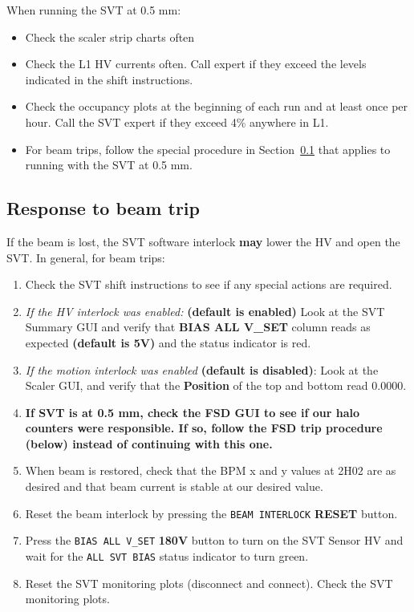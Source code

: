 \documentclass[12pt]{report}
\begin{document}
When running the SVT at 0.5 mm:
\begin{itemize}
\item Check the scaler strip charts often
\item Check the L1 HV currents often.  Call expert if they exceed the levels indicated in the shift instructions.
\item Check the occupancy plots at the beginning of each run and at least once per hour.  Call the SVT expert if they exceed 4\% anywhere in L1.
\item For beam trips, follow the special procedure in Section~\ref{sec:proc_general_beamtrip} that applies to running with the SVT at 0.5 mm.
\end{itemize}

\subsection{Response to beam trip}
\label{sec:proc_general_beamtrip}
If the beam is lost, the SVT software interlock \textbf{may} lower the HV and open the SVT.  In general, for beam trips:
\begin{enumerate}
\item Check the SVT shift instructions to see if any special actions are required.
\item \textit{If the HV interlock was enabled:} \textbf{(default is enabled)} Look at the SVT Summary GUI and verify that \textbf{BIAS ALL V\_SET} column reads as expected \textbf{(default is 5V)} and the status indicator is red.
\item \textit{If the motion interlock was enabled} \textbf{(default is disabled)}: Look at the Scaler GUI, and verify that the \textbf{Position} of the top and bottom read 0.0000.
\item \textbf{If SVT is at 0.5 mm, check the FSD GUI to see if our halo counters were responsible. If so, follow the FSD trip procedure (below) instead of continuing with this one.}
\item When beam is restored, check that the BPM x and y values at 2H02 are as desired and that beam current is stable at our desired value.
\item Reset the beam interlock by pressing the \texttt{BEAM INTERLOCK} \textbf{RESET} button.
\item Press the \texttt{BIAS ALL V\_SET} \textbf{180V} button to turn on the SVT Sensor HV and wait for the \texttt{ALL SVT BIAS} status indicator to turn green.
\item Reset the SVT monitoring plots (disconnect and connect). Check the SVT monitoring plots.
\end{enumerate}
\end{document}
